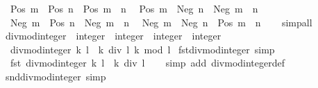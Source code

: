 \begin{isabellebody}
\ \ {\isachardoublequoteopen}Pos\ m\ {\isacharasterisk}{\kern0pt}\ Pos\ n\ {\isacharequal}{\kern0pt}\ Pos\ {\isacharparenleft}{\kern0pt}m\ {\isacharasterisk}{\kern0pt}\ n{\isacharparenright}{\kern0pt}{\isachardoublequoteclose}\isanewline
\ \ {\isachardoublequoteopen}Pos\ m\ {\isacharasterisk}{\kern0pt}\ Neg\ n\ {\isacharequal}{\kern0pt}\ Neg\ {\isacharparenleft}{\kern0pt}m\ {\isacharasterisk}{\kern0pt}\ n{\isacharparenright}{\kern0pt}{\isachardoublequoteclose}\isanewline
\ \ {\isachardoublequoteopen}Neg\ m\ {\isacharasterisk}{\kern0pt}\ Pos\ n\ {\isacharequal}{\kern0pt}\ Neg\ {\isacharparenleft}{\kern0pt}m\ {\isacharasterisk}{\kern0pt}\ n{\isacharparenright}{\kern0pt}{\isachardoublequoteclose}\isanewline
\ \ {\isachardoublequoteopen}Neg\ m\ {\isacharasterisk}{\kern0pt}\ Neg\ n\ {\isacharequal}{\kern0pt}\ Pos\ {\isacharparenleft}{\kern0pt}m\ {\isacharasterisk}{\kern0pt}\ n{\isacharparenright}{\kern0pt}{\isachardoublequoteclose}\isanewline
%
\isadelimproof
\ \ %
\endisadelimproof
%
\isatagproof
{}\isamarkupfalse%
\ simp{\isacharunderscore}{\kern0pt}all%
\endisatagproof
{\isafoldproof}%
%
\isadelimproof
\isanewline
%
\endisadelimproof
\isanewline
{}\isamarkupfalse%
\ divmod{\isacharunderscore}{\kern0pt}integer\ {\isacharcolon}{\kern0pt}{\isacharcolon}{\kern0pt}\ {\isachardoublequoteopen}integer\ {\isasymRightarrow}\ integer\ {\isasymRightarrow}\ integer\ {\isasymtimes}\ integer{\isachardoublequoteclose}\isanewline
{}\isanewline
\ \ {\isachardoublequoteopen}divmod{\isacharunderscore}{\kern0pt}integer\ k\ l\ {\isacharequal}{\kern0pt}\ {\isacharparenleft}{\kern0pt}k\ div\ l{\isacharcomma}{\kern0pt}\ k\ mod\ l{\isacharparenright}{\kern0pt}{\isachardoublequoteclose}\isanewline
\isanewline
{}\isamarkupfalse%
\ fst{\isacharunderscore}{\kern0pt}divmod{\isacharunderscore}{\kern0pt}integer\ {\isacharbrackleft}{\kern0pt}simp{\isacharbrackright}{\kern0pt}{\isacharcolon}{\kern0pt}\isanewline
\ \ {\isachardoublequoteopen}fst\ {\isacharparenleft}{\kern0pt}divmod{\isacharunderscore}{\kern0pt}integer\ k\ l{\isacharparenright}{\kern0pt}\ {\isacharequal}{\kern0pt}\ k\ div\ l{\isachardoublequoteclose}\isanewline
%
\isadelimproof
\ \ %
\endisadelimproof
%
\isatagproof
{}\isamarkupfalse%
\ {\isacharparenleft}{\kern0pt}simp\ add{\isacharcolon}{\kern0pt}\ divmod{\isacharunderscore}{\kern0pt}integer{\isacharunderscore}{\kern0pt}def{\isacharparenright}{\kern0pt}%
\endisatagproof
{\isafoldproof}%
%
\isadelimproof
\isanewline
%
\endisadelimproof
\isanewline
{}\isamarkupfalse%
\ snd{\isacharunderscore}{\kern0pt}divmod{\isacharunderscore}{\kern0pt}integer\ {\isacharbrackleft}{\kern0pt}simp{\isacharbrackright}{\kern0pt}{\isacharcolon}{\kern0pt}\isanewline

\end{isabellebody}
